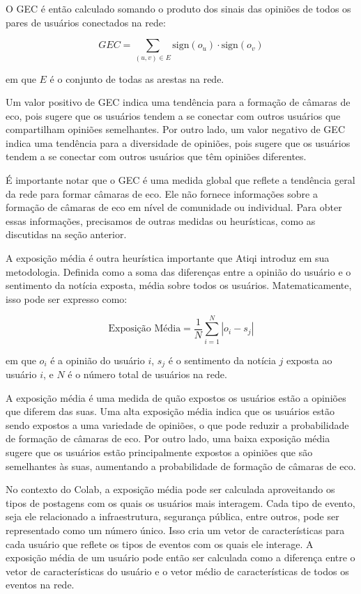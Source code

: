O GEC é então calculado somando o produto dos sinais das opiniões de todos os pares de usuários conectados na rede:

\begin{equation}
	GEC = \sum_{(u, v) \in E} \text{sign}(o_u) \cdot \text{sign}(o_v)
\end{equation}

em que $E$ é o conjunto de todas as arestas na rede.

Um valor positivo de GEC indica uma tendência para a formação de câmaras de eco, pois sugere que os usuários tendem a se conectar com outros usuários que compartilham opiniões semelhantes. Por outro lado, um valor negativo de GEC indica uma tendência para a diversidade de opiniões, pois sugere que os usuários tendem a se conectar com outros usuários que têm opiniões diferentes.

É importante notar que o GEC é uma medida global que reflete a tendência geral da rede para formar câmaras de eco. Ele não fornece informações sobre a formação de câmaras de eco em nível de comunidade ou individual. Para obter essas informações, precisamos de outras medidas ou heurísticas, como as discutidas na seção anterior.

A exposição média é outra heurística importante que Atiqi introduz em sua metodologia. Definida como a soma das diferenças entre a opinião do usuário e o sentimento da notícia exposta, média sobre todos os usuários. Matematicamente, isso pode ser expresso como:

\begin{equation}
	\text{{Exposição Média}} = \frac{1}{N} \sum_{i=1}^{N} |o_i - s_j|
\end{equation}

em que $o_i$ é a opinião do usuário $i$, $s_j$ é o sentimento da notícia $j$ exposta ao usuário $i$, e $N$ é o número total de usuários na rede.

A exposição média é uma medida de quão expostos os usuários estão a opiniões que diferem das suas. Uma alta exposição média indica que os usuários estão sendo expostos a uma variedade de opiniões, o que pode reduzir a probabilidade de formação de câmaras de eco. Por outro lado, uma baixa exposição média sugere que os usuários estão principalmente expostos a opiniões que são semelhantes às suas, aumentando a probabilidade de formação de câmaras de eco.

No contexto do Colab, a exposição média pode ser calculada aproveitando os tipos de postagens com os quais os usuários mais interagem. Cada tipo de evento, seja ele relacionado a infraestrutura, segurança pública, entre outros, pode ser representado como um número único. Isso cria um vetor de características para cada usuário que reflete os tipos de eventos com os quais ele interage. A exposição média de um usuário pode então ser calculada como a diferença entre o vetor de características do usuário e o vetor médio de características de todos os eventos na rede.

